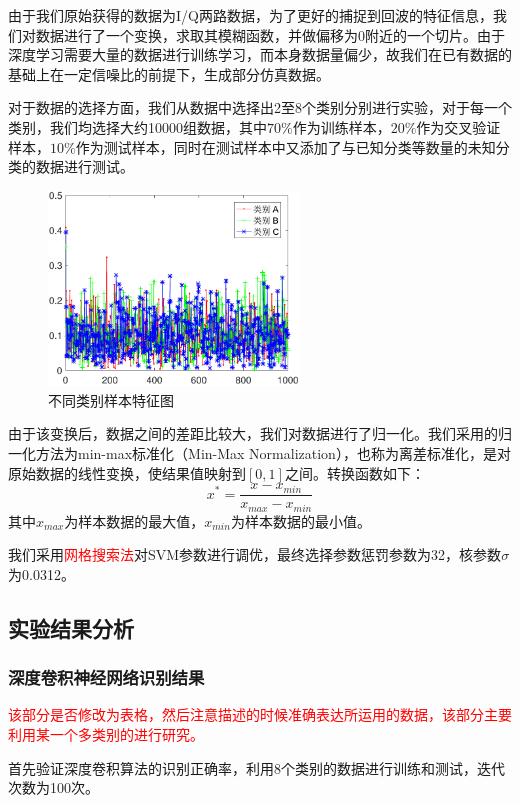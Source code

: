 由于我们原始获得的数据为I/Q两路数据，为了更好的捕捉到回波的特征信息，我们对数据进行了一个变换，求取其模糊函数，并做偏移为0附近的一个切片。由于深度学习需要大量的数据进行训练学习，而本身数据量偏少，故我们在已有数据的基础上在一定信噪比的前提下，生成部分仿真数据。

对于数据的选择方面，我们从数据中选择出2至8个类别分别进行实验，对于每一个类别，我们均选择大约10000组数据，其中$70\%$作为训练样本，$20\%$作为交叉验证样本，$10\%$作为测试样本，同时在测试样本中又添加了与已知分类等数量的未知分类的数据进行测试。
\begin{figure}[htb]
	\centering
	\includegraphics[width=6.67cm]{figures/emitter/diff_data}
	\caption{不同类别样本特征图}
\end{figure}
由于该变换后，数据之间的差距比较大，我们对数据进行了归一化。我们采用的归一化方法为min-max标准化（Min-Max Normalization），也称为离差标准化，是对原始数据的线性变换，使结果值映射到$[0 , 1]$之间。转换函数如下：
\begin{equation}
x^{*}=\frac{x-x_{min}}{x_{max}-x_{min}}
\end{equation}
其中$x_{max}$为样本数据的最大值，$x_{min}$为样本数据的最小值。

我们采用\textcolor{red}{网格搜索法}对SVM参数进行调优，最终选择参数惩罚参数为32，核参数$\sigma$为0.0312。

\subsection{实验结果分析}

\subsubsection{深度卷积神经网络识别结果}

\textcolor{red}{该部分是否修改为表格，然后注意描述的时候准确表达所运用的数据，该部分主要利用某一个多类别的进行研究。}

首先验证深度卷积算法的识别正确率，利用8个类别的数据进行训练和测试，迭代次数为100次。

